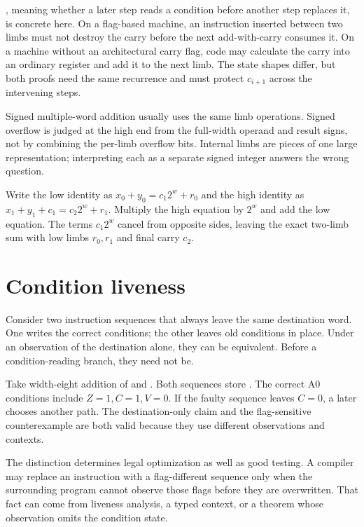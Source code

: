 , meaning whether a later step reads a condition
before another step replaces it, is concrete here. On a flag-based machine, an
instruction inserted between two limbs must not destroy the carry before the
next add-with-carry consumes it. On a machine without an architectural carry
flag, code may calculate the carry into an ordinary register and add it to the
next limb. The state shapes differ, but both proofs need the same recurrence
and must protect \(c_{i+1}\) across the intervening steps.

Signed multiple-word addition usually uses the same limb operations. Signed
overflow is judged at the high end from the full-width operand and result
signs, not by combining the per-limb overflow bits. Internal limbs are pieces
of one large representation; interpreting each as a separate signed integer
answers the wrong question.

\begin{proofkit}[title={Two-limb carry composition}]
Write the low identity as
\(x_0+y_0=c_1 2^w+r_0\) and the high identity as
\(x_1+y_1+c_1=c_2 2^w+r_1\). Multiply the high equation by \(2^w\) and add
the low equation. The terms \(c_1 2^w\) cancel from opposite sides, leaving
the exact two-limb sum with low limbs \(r_0,r_1\) and final carry \(c_2\).
\end{proofkit}

\section{Condition liveness}

Consider two instruction sequences that always leave the same destination
word. One writes the correct conditions; the other leaves old conditions in
place. Under an observation of the destination alone, they can be equivalent.
Before a condition-reading branch, they need not be.

Take width-eight addition of  and . Both sequences store
. The correct A0 conditions include \(Z=1,C=1,V=0\). If the faulty
sequence leaves \(C=0\), a later  chooses another path. The
destination-only claim and the flag-sensitive counterexample are both valid
because they use different observations and contexts.

The distinction determines legal optimization as well as good testing. A
compiler may replace an instruction with a flag-different sequence only when
the surrounding program cannot observe those flags before they are overwritten.
That fact can come from liveness analysis, a typed context, or a theorem whose
observation omits the condition state.

